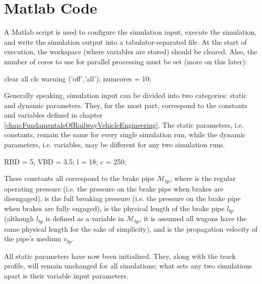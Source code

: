 \section{Matlab Code}
\label{sec:MatlabCode}
\par\noindent
A Matlab script is used to configure the simulation input, execute the simulation, and write the simulation output into a tabulator-separated file. At the start of execution, the workspace (where variables are stored) should be cleared. Also, the number of cores to use for parallel processing must be set (more on this later):

\bigskip
\begin{python}
clear all
clc
warning ('off','all');
numcores = 10;
\end{python}
\bigskip

\noindent
Generally speaking, simulation input can be divided into two categories: static and dynamic parameters. They, for the most part, correspond to the constants and variables defined in chapter \ref{chap:FundamentalsOfRailwayVehicleEngineering}. The static parameters, i.e. constants, remain the same for every single simulation run, while the dynamic parameters, i.e. variables, may be different for any two simulation runs.

\bigskip
\begin{python}
RBD = 5; 
VBD = 3.5; 
l = 18; 
c = 250; 
\end{python}
\bigskip

\noindent
These constants all correspond to the brake pipe ${\mathcal{M}}_{bp}$, where  is the regular operating pressure (i.e. the pressure on the brake pipe when brakes are disengaged),  is the full breaking pressure (i.e. the pressure on the brake pipe when brakes are fully engaged),  is the physical length of the brake pipe $l_{bp}$ (although $l_{bp}$ is defined as a variable in ${\mathcal{M}}_{bp}$, it is assumed all wagons have the same physical length for the sake of simplicity), and  is the propagation velocity of the pipe's medium $v_{bp}$.

%
%
%
\par\noindent
All static parameters have now been initialized. They, along with the track profile, will remain unchanged for all simulations; what sets any two simulations apart is their variable input parameters.

